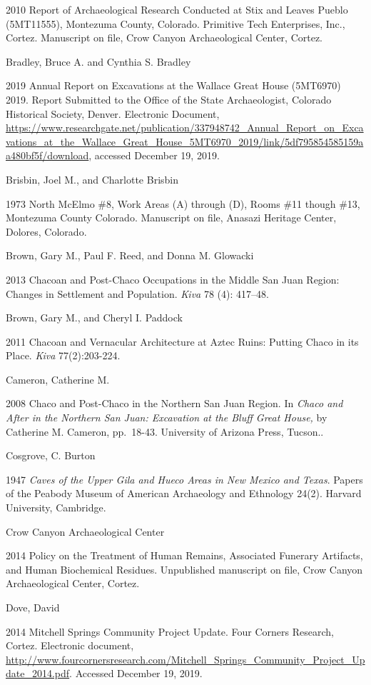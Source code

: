 \documentclass[
  12pt,
]{krantz}
\begin{document}
2010 Report of Archaeological Research Conducted at Stix and Leaves
Pueblo (5MT11555), Montezuma County, Colorado. Primitive Tech
Enterprises, Inc., Cortez. Manuscript on file, Crow Canyon
Archaeological Center, Cortez.

Bradley, Bruce A. and Cynthia S. Bradley

2019 Annual Report on Excavations at the Wallace Great House (5MT6970)
2019. Report Submitted to the Office of the State Archaeologist,
Colorado Historical Society, Denver. Electronic Document,
\url{https://www.researchgate.net/publication/337948742_Annual_Report_on_Excavations_at_the_Wallace_Great_House_5MT6970_2019/link/5df795854585159aa480bf5f/download},
accessed December 19, 2019.

Brisbin, Joel M., and Charlotte Brisbin

1973 North McElmo \#8, Work Areas (A) through (D), Rooms \#11 though
\#13, Montezuma County Colorado. Manuscript on file, Anasazi Heritage
Center, Dolores, Colorado.

Brown, Gary M., Paul F. Reed, and Donna M. Glowacki

2013 Chacoan and Post-Chaco Occupations in the Middle San Juan Region:
Changes in Settlement and Population. \emph{Kiva} 78 (4): 417--48.

Brown, Gary M., and Cheryl I. Paddock

2011 Chacoan and Vernacular Architecture at Aztec Ruins: Putting Chaco
in its Place. \emph{Kiva} 77(2):203-224.

Cameron, Catherine M.

2008 Chaco and Post-Chaco in the Northern San Juan Region. In \emph{Chaco and
After in the Northern San Juan: Excavation at the Bluff Great House,} by
Catherine M. Cameron, pp.~18-43. University of Arizona Press, Tucson..

Cosgrove, C. Burton

1947 \emph{Caves of the Upper Gila and Hueco Areas in New Mexico and Texas}.
Papers of the Peabody Museum of American Archaeology and Ethnology
24(2). Harvard University, Cambridge.

Crow Canyon Archaeological Center

2014 Policy on the Treatment of Human Remains, Associated Funerary
Artifacts, and Human Biochemical Residues. Unpublished manuscript on
file, Crow Canyon Archaeological Center, Cortez.

Dove, David

2014 Mitchell Springs Community Project Update. Four Corners Research,
Cortez. Electronic document,
\url{http://www.fourcornersresearch.com/Mitchell_Springs_Community_Project_Update_2014.pdf}.
Accessed December 19, 2019.
\end{document}
